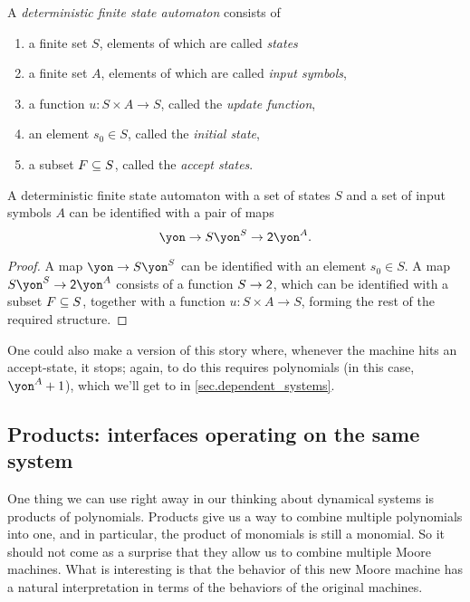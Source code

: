 \documentclass[Book-Poly]{subfiles}
\begin{document}
\begin{definition}\label{def.dfa}
A \emph{deterministic finite state automaton} consists of
\begin{enumerate}
	\item a finite set $S$, elements of which are called \emph{states}
	\item a finite set $A$, elements of which are called \emph{input symbols},
	\item a function $u\colon S\times A\to S$, called the \emph{update function},
	\item an element $s_0\in S$, called the \emph{initial state},
	\item a subset $F\ss S$, called the \emph{accept states}.
\end{enumerate}
\end{definition}

\begin{proposition}
A deterministic finite state automaton with a set of states $S$ and a set of input symbols $A$ can be identified with a pair of maps
\[
\yon\to S\yon^S\to \2\yon^A.
\]
\end{proposition}
\begin{proof}
A map $\yon\to S\yon^S$ can be identified with an element $s_0\in S$.
A map $S\yon^S\to\2\yon^A$ consists of a function $S\to\2$, which can be identified with a subset $F \ss S$, together with a function $u \colon S\times A\to S$, forming the rest of the required structure.
\end{proof}

One could also make a version of this story where, whenever the machine hits an accept-state, it stops; again, to do this requires polynomials (in this case, $\yon^A+1$), which we'll get to in \cref{sec.dependent_systems}.


\subsection{Products: interfaces operating on the same system}

One thing we can use right away in our thinking about dynamical systems is products of polynomials.
Products give us a way to combine multiple polynomials into one, and in particular, the product of monomials is still a monomial.
So it should not come as a surprise that they allow us to combine multiple Moore machines.
What is interesting is that the behavior of this new Moore machine has a natural interpretation in terms of the behaviors of the original machines.
\end{document}
